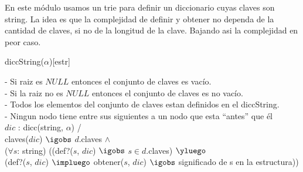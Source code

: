 \begin{Representacion}
  
  
	En este m\'odulo usamos un trie para definir un diccionario cuyas claves son string.
$ $\newline La idea es que la complejidad de definir y obtener no dependa de la cantidad de claves, si no de la longitud de la clave. Bajando asi la complejidad en peor caso.  
  
  \begin{Estructura}{diccString($\alpha$)}[estr]
    \begin{Tupla}[estr]
    \end{Tupla}

    \begin{Tupla}[nodo]
    \end{Tupla}
  \end{Estructura}



- Si raiz es $NULL$ entonces el conjunto de claves es vac\'io. \\
- Si la raiz no es $NULL$ entonces el conjunto de claves es no vac\'io. \\
- Todos los elementos del conjunto de claves estan definidos en el diccString. \\
- Ningun nodo tiene entre sus siguientes a un nodo que esta ``antes'' que \'el \\ 

%
{
$dic$ : dicc(string, $\alpha$) / \\
	claves($dic$) $\igobs$ $d$.claves $\land$ \\
	
	($\forall s$: string) 
		((def?($s$, $dic$) $\igobs$ $s \in d$.claves)  $\yluego$ \\
		(def?($s$, $dic$) $\impluego$ obtener($s$, $dic$) $\igobs$ significado de s en la estructura))   
}%

\end{Representacion}

